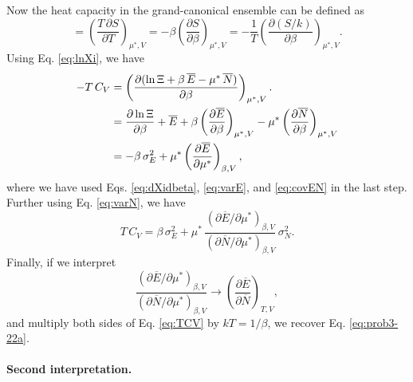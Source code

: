 \documentclass[reprint]{revtex4-1}
\numberwithin{equation}{section}
\begin{document}
Now the heat capacity in the grand-canonical ensemble can be defined as
%
\begin{equation}
= \left( \frac{ T \, \partial S } { \partial T } \right)_{\mu^*, V}
= -\beta \left( \frac{ \partial S } { \partial \beta } \right)_{\mu^*, V}
= -\frac{1}{T} \left( \frac{ \partial (S/k) } { \partial \beta } \right)_{\mu^*, V}.
\label{eq:CV_def}
\end{equation}
%
Using Eq. \eqref{eq:lnXi}, we have
\begin{align}
-T \, C_V
  &= \left( \frac{ \partial (\ln \Xi + \beta \, \overline E - \mu^* \, \overline N) }
  { \partial \beta } \right)_{\mu^*, V}.
  \notag
  \\
  &= \frac{ \partial \ln \Xi } { \partial \beta }
  + \overline E
  + \beta \left( \frac{ \partial \overline E } { \partial \beta } \right)_{\mu^*, V}
  - \mu^* \left( \frac{ \partial \overline N } { \partial \beta } \right)_{\mu^*, V}
  \notag
  \\
  &=
  - \beta \, \sigma_E^2
  + \mu^* \left( \frac{ \partial \overline E } { \partial \mu^* } \right)_{\beta, V}
  ,
  \notag
\end{align}
%
where we have used Eqs. \eqref{eq:dXidbeta}, \eqref{eq:varE}, and \eqref{eq:covEN}
in the last step.
%
Further using Eq. \eqref{eq:varN}, we have
\begin{equation}
T \, C_V
=
\beta \, \sigma_E^2
+
\mu^* \,
\frac{ \left( \partial \overline E / \partial \mu^* \right)_{\beta, V} }
     { \left( \partial \overline N / \partial \mu^* \right)_{\beta, V} }
\, \sigma_N^2
.
\label{eq:TCV}
\end{equation}
Finally, if we interpret
$$
\frac{ \left( \partial \overline E / \partial \mu^* \right)_{\beta, V} }
     { \left( \partial \overline N / \partial \mu^* \right)_{\beta, V} }
\to
\left(
  \frac{ \partial \overline E }
       { \partial \overline N }
\right)_{T, V}
,
$$
and multiply both sides of Eq. \eqref{eq:TCV} by $k T = 1/\beta$,
we recover Eq. \eqref{eq:prob3-22a}.

\paragraph*{Second interpretation.}
\end{document}
